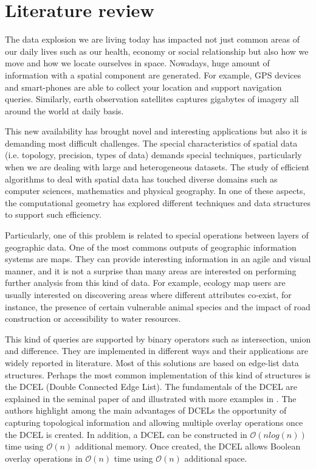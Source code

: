 \section{Literature review}
The data explosion we are living today has impacted not just common areas of our daily lives such as our health, economy or social relationship but also how we move and how we locate ourselves in space.  Nowadays, huge amount of information with a spatial component are generated.  For example, GPS devices and smart-phones are able to collect your location and support navigation queries.  Similarly, earth observation satellites captures gigabytes of imagery all around the world at daily basis.

This new availability has brought novel and interesting applications but also it is demanding most difficult challenges.  The special characteristics of spatial data (i.e. topology, precision, types of data) demands special techniques, particularly when we are dealing with large and heterogeneous datasets.  The study of efficient algorithms to deal with spatial data has touched diverse domains such as computer sciences, mathematics and physical geography.  In one of these aspects, the computational geometry has explored different techniques and data structures to support such efficiency.

Particularly, one of this problem is related to special operations between layers of geographic data.  One of the most commons outputs of geographic information systems are maps.  They can provide interesting information in an agile and visual manner, and it is not a surprise than many areas are interested on performing further analysis from this kind of data.  For example, ecology map users are usually interested on discovering areas where different attributes co-exist, for instance, the presence of certain vulnerable animal species and the impact of road construction or accessibility to water resources.  

This kind of queries are supported by binary operators such as intersection, union and difference.  They are implemented in different ways and their applications are widely reported in literature.  Most of this solutions are based on edge-list data structures.  Perhaps the most common implementation of this kind of structures is the DCEL (Double Connected Edge List).  The fundamentals of the DCEL are explained in the seminal paper of \cite{muller_finding_1978} and illustrated with more examples in \cite{preparata_computational_1985}.  The authors highlight among the main advantages of DCELs the opportunity of capturing topological information and allowing multiple overlay operations once the DCEL is created.  In addition, a DCEL can be constructed in $\mathcal{O}(n log(n))$ time using $\mathcal{O}(n)$ additional memory. Once created, the DCEL allows Boolean overlay operations in $\mathcal{O}(n)$ time using $\mathcal{O}(n)$ additional space. 

